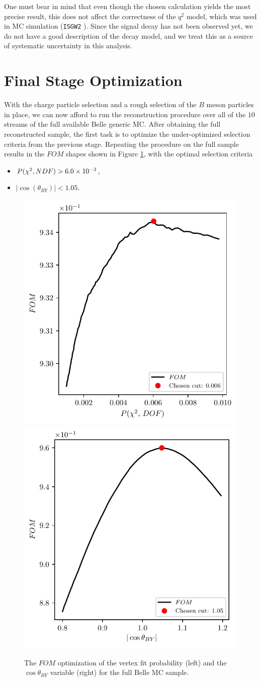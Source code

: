 One must bear in mind that even though the chosen calculation yields the most precise result, this does not affect the correctness of the $q^2$ model, which was used in MC simulation (\texttt{ISGW2} \cite{Scora:1995ty}). Since the signal decay has not been observed yet, we do not have a good description of the decay model, and we treat this as a source of systematic uncertainty in this analysis.
\newpage
\section{Final Stage Optimization}

With the charge particle selection and a rough selection of the $B$ meson particles in place, we can now afford to run the reconstruction procedure over all of the $10$ streams of the full available Belle generic MC. After obtaining the full reconstructed sample, the first task is to optimize the under-optimized selection criteria from the previous stage. Repeating the procedure on the full sample results in the $FOM$ shapes shown in Figure \ref{fig:preciseFOM}, with the optimal selection criteria

\begin{itemize}
	\item $P(\chi^2,NDF) > 6.0\times 10^{-3}$,
	\item $\vert \cos \left(\theta_{BY}\right) \vert < 1.05$.
\end{itemize}

\begin{figure}[H]
	\centering
	\captionsetup{width=0.8\linewidth}
	\includegraphics[width=0.48\linewidth]{fig/VTX_precise}
	\includegraphics[width=0.48\linewidth]{fig/cosBY_precise}
	\caption{The $FOM$ optimization of the vertex fit probability (left) and the $\cos \theta_{BY}$ variable (right) for the full Belle MC sample.}
	\label{fig:preciseFOM}
\end{figure}

